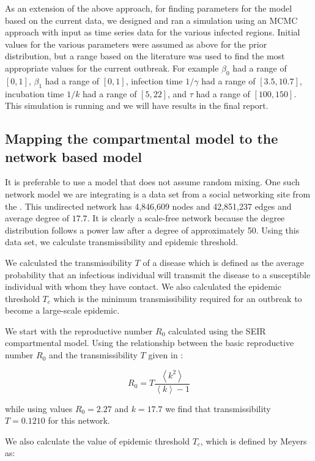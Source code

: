 \documentclass[10pt, journal,onecolumn]{IEEEtran}
\begin{document}
As an extension of the above approach, for finding parameters for the model based on the current data,
we designed and ran a simulation using an MCMC approach with input as time series data for the
various infected regions. Initial values for the various parameters were assumed as above for the
prior distribution, but a range based on the literature was used to find the most appropriate
values for the current outbreak. For example $\beta_0$  had a range of $[0,1]$,  $\beta_1$ had a range of
$[0,1]$, infection time $1/\gamma$ had a range of $[3.5,10.7]$, incubation time $1/k$ had a range of $[5,22]$,
and $\tau$ had a range of $[100,150]$. This simulation is running and we will
have results in the final report.




\subsection*{\textbf{Mapping the compartmental model to the network based model}}

It is preferable to use a model that does not assume random mixing.
One such network model we are integrating is a data set from a social networking site from
the \cite{topcoderdata}.
This undirected network has 4,846,609 nodes and 42,851,237 edges and average degree of $17.7$.
It is clearly a scale-free network because the degree distribution follows a power law after a degree of
approximately 50.
Using this data set, we calculate transmissibility and epidemic threshold.

We calculated the transmissibility $T$ of a disease which is defined as the average probability that an infectious
individual will transmit the disease to a susceptible individual with whom they have contact. We also calculated
the epidemic threshold $T_c$ which is the minimum transmissibility required for an outbreak to become
a large-scale epidemic.

We start with the reproductive number $R_0$ calculated using the SEIR compartmental model.
Using the relationship between the basic reproductive number
$R_0$ and the transmissibility $T$ given in \cite{meyers2005network}:

\[
R_0 = T  \dfrac{\left\langle k^2 \right\rangle}{\left\langle k \right\rangle-1}
\]

while using values $R_0=2.27$ and $k=17.7$ we find that transmissibility $T=0.1210$ for this network.

We also calculate the value of epidemic threshold $T_c$, which is defined by Meyers as:
\end{document}
